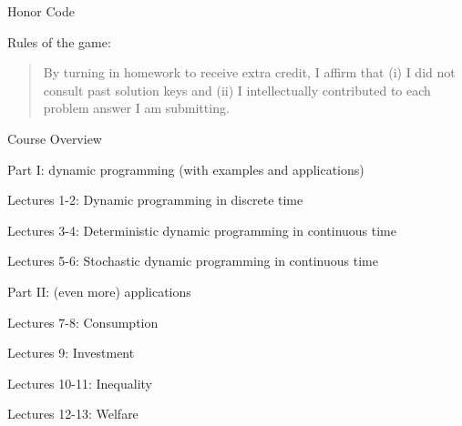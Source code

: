 \documentclass[11pt, aspectratio=169]{beamer}
\newenvironment{witemize}{\itemize\addtolength{\itemsep}{10pt}}{\enditemize}
\begin{document}
\begin{frame}{Honor Code}

Rules of the game:

\vspace{5mm}
\begin{quote}
	By turning in homework to receive extra credit, I affirm that (i) I did not consult past solution keys and (ii) I intellectually contributed to each problem answer I am submitting.
\end{quote}

\end{frame}

\begin{frame}{Course Overview}

Part I: dynamic programming (with examples and applications)
\begin{witemize}
\vspace{1mm}
\item Lectures 1-2: Dynamic programming in discrete time
\vspace{-2mm}
\item Lectures 3-4: Deterministic dynamic programming in continuous time
\vspace{-2mm}
\item Lectures 5-6: Stochastic dynamic programming in continuous time
\end{witemize}

\vspace{5mm}
Part II: (even more) applications
\begin{witemize}
\vspace{1mm}
\item Lectures 7-8: Consumption
\vspace{-2mm}
\item Lectures 9: Investment
\vspace{-2mm}
\item Lectures 10-11: Inequality
\vspace{-2mm}
\item Lectures 12-13: Welfare 
\end{witemize}
\end{frame}
\end{document}
